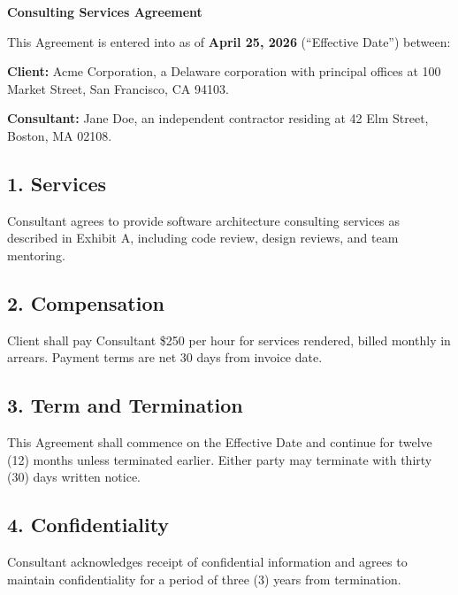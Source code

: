 \documentclass{article}
\begin{document}
\begin{center}
  {\Large\bfseries Consulting Services Agreement}
\end{center}

\vspace{0.3cm}

This Agreement is entered into as of \textbf{April 25, 2026} (``Effective Date'') between:

\vspace{0.2cm}

\noindent
\textbf{Client:} Acme Corporation, a Delaware corporation with principal offices at 100 Market Street, San Francisco, CA 94103.

\vspace{0.2cm}

\noindent
\textbf{Consultant:} Jane Doe, an independent contractor residing at 42 Elm Street, Boston, MA 02108.

\vspace{0.3cm}

\subsection*{1. Services}
Consultant agrees to provide software architecture consulting services as described in Exhibit A, including code review, design reviews, and team mentoring.

\subsection*{2. Compensation}
Client shall pay Consultant \$250 per hour for services rendered, billed monthly in arrears. Payment terms are net 30 days from invoice date.

\subsection*{3. Term and Termination}
This Agreement shall commence on the Effective Date and continue for twelve (12) months unless terminated earlier. Either party may terminate with thirty (30) days written notice.

\subsection*{4. Confidentiality}
Consultant acknowledges receipt of confidential information and agrees to maintain confidentiality for a period of three (3) years from termination.
\end{document}
